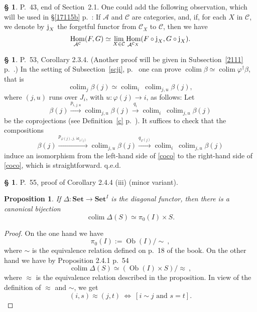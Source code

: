 \documentclass[12pt]{article}
\newtheorem{prop}[thm]{Proposition}
\theoremstyle{remark}
\newtheorem{rk}[thm]{Remark}
\theoremstyle{definition}
\newtheorem{s}[thm]{\S}
\newcommand{\bu}{\bullet}
\newcommand{\A}{\mathcal A}
\newcommand{\C}{\mathcal C}
\newcommand{\Set}{\mathbf{Set}}
\newcommand{\mv}{ (minor variant)}
\DeclareMathOperator*{\coli}{colim}
\DeclareMathOperator*{\co}{colim}
\DeclareMathOperator{\id}{id}
\DeclareMathOperator{\Hom}{Hom}%
\DeclareMathOperator{\Ob}{Ob}
\begin{document}
%
%
\begin{s} 
P.~43, end of Section~2.1. One could add the following observation, which will be used in \S\ref{17115b} p.~\pageref{17115b}: If $\A$ and $\C$ are categories, and, if, for each $X$ in $\C$, we denote by $\text j_X$ the forgetful functor from $\C_X$ to $\C$, then we have 
\begin{equation}\label{17115}
\Hom_{\A^\C}(F,G)\simeq\lim_{X\in\C}\Hom_{\A^{\C_X}}(F\circ\text j_X,G\circ\text j_X).
\end{equation}
\end{s}
%
%
%
%
\begin{s} P.~53, Corollary 2.3.4. (Another proof will be given in Subsection~\ref{2111} p.~\pageref{2111}.) In the setting of Subsection~\ref{scji}, p.~\pageref{scji} one can prove $\co\beta\simeq\co\varphi^\dagger\beta$, that is 
%
\begin{equation}\label{coco} 
\co_j\beta(j)\simeq\co_i\ \co_{j,u}\beta(j),
\end{equation} 
%
where $(j,u)$ runs over $J_i$, with $u:\varphi(j)\to i$, as follows: Let 
$$ 
\beta(j)\xrightarrow{p_{i,j,u}}\co_{j,u}\beta(j)\xrightarrow{q_i}\co_i\ \co_{j,u}\beta(j)
$$ 
be the coprojections (see Definition~\ref{c} p.~\pageref{c}). It suffices to check that the compositions 
$$
\beta(j)\xrightarrow{p_{\varphi(j),j,\id_{\varphi(j)}}}\co_{j,u}\beta(j)\xrightarrow{q_{\varphi(j)}}\co_i\ \co_{j,u}\beta(j)
$$ 
induce an isomorphism from the left-hand side of \eqref{coco} to the right-hand side of \eqref{coco}, which is straightforward. q.e.d.
\end{s}
%
%
\begin{s} 
P.~55, proof of Corollary 2.4.4 (iii)\mv.
%
\begin{prop}\label{244}
If $\Delta:\Set\to\Set^I$ is the diagonal functor, then there is a canonical bijection
$$
\coli\Delta(S)\simeq\pi_0(I)\times S.
$$
\end{prop} 
%
\begin{proof}
On the one hand we have 
$$
\pi_0(I):=\Ob(I)/\!\!\sim\ , 
$$
where $\sim$ is the equivalence relation defined on p.~18 of the book. On the other hand we have by Proposition 2.4.1 p.~54
$$
\coli\Delta(S)\simeq(\Ob(I)\times S)/\!\!\approx\ ,
$$
where $\approx$ is the equivalence relation described in the proposition. In view of the definition of $\approx$ and $\sim$, we get 
$$
(i,s)\approx(j,t)\ \iff\ [i\sim j\text{ and }s=t].
$$ 
\end{proof}
\end{s}
\end{document}
